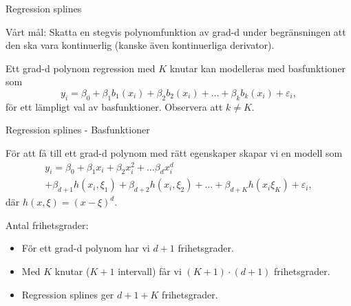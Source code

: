 \documentclass[10pt,english]{beamer}
\begin{document}
\begin{frame}{Regression splines}
    
    \begin{greenbox}
        Vårt mål: Skatta en stegvis polynomfunktion av grad-d under begränsningen att den ska vara kontinuerlig (kanske även kontinuerliga derivator).
    \end{greenbox}

    Ett grad-d polynom regression med $K$ knutar kan modelleras med basfunktioner som
    \begin{equation*}
        y_i = \beta_0 + \beta_1 b_1(x_i) + \beta_2 b_2(x_i) + \ldots + \beta_k b_k(x_i) + \varepsilon_i,
    \end{equation*}
    för ett lämpligt val av basfunktioner. Observera att $k \neq K$.

\end{frame}

\begin{frame}{Regression splines - Basfunktioner}

    För att få till ett grad-d polynom med rätt egenskaper skapar vi en modell som
    \begin{multline*}
        y_i = \beta_0 + \beta_1 x_i + \beta_2 x_i^2 + \ldots \beta_d x_i^d \\
        + \beta_{d+1} h(x_i, \xi_1) + \beta_{d+2} h(x_i, \xi_2) + \ldots + \beta_{d+K} h(x_i \xi_K) + \varepsilon_i,
    \end{multline*}
    där $h(x, \xi) = (x - \xi)^d$.

    Antal frihetsgrader:
    \begin{itemize}
        \item För ett grad-d polynom har vi $d+1$ frihetsgrader.
        \item Med $K$ knutar ($K+1$ intervall) får vi $(K+1)\cdot(d+1)$ frihetsgrader.
        \item Regression splines ger $d + 1 + K$ frihetsgrader.
    \end{itemize}
    
\end{frame}
\end{document}
